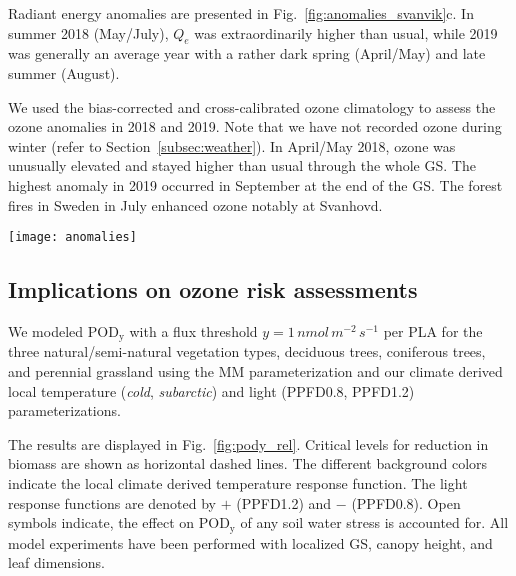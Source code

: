 \documentclass[bg, manuscript]{copernicus}
\begin{document}
Radiant energy anomalies are presented in Fig.~\ref{fig:anomalies_svanvik}c. In summer 2018 (May/July), $Q_e$ was extraordinarily higher than usual, while 2019 was generally an average year with a rather dark spring (April/May) and late summer (August).

We used the bias-corrected and cross-calibrated ozone climatology \citep{ACP:Falk2021} to assess the ozone anomalies in 2018 and 2019. Note that we have not recorded ozone during winter (refer to Section~\ref{subsec:weather}). In April/May 2018, ozone was unusually elevated and stayed higher than usual through the whole GS. The highest anomaly in 2019 occurred in September at the end of the GS. The forest fires in Sweden in July enhanced ozone notably at Svanhovd.

\begin{figure*}[t]
  
  \centering
  \texttt{[image: anomalies]}
  \caption{2018 and 2019 anomalies of key environmental variables at Svanhovd displayed as difference from median for each month. The hatched area between indicates the IQR. (a) Temperature; (b) precipitation; (c) radiant energy; (d) ozone VMR.}
  \label{fig:anomalies_svanvik}
\end{figure*}


\subsection{Implications on ozone risk assessments}
\label{subsec:do3se_results}

We modeled $\mathrm{POD_y}$ with a flux threshold $y=1\,\unit{nmol\,m^{-2}\,s^{-1}}$ per PLA for the three natural/semi-natural vegetation types, deciduous trees, coniferous trees, and perennial grassland using the MM parameterization and our climate derived local temperature (\emph{cold}, \emph{subarctic}) and light (PPFD0.8, PPFD1.2) parameterizations. 

The results are displayed in Fig.~\ref{fig:pody_rel}. Critical levels for reduction in biomass \citep[deciduous forest $4\,\unit{\%}$, coniferous forest $2\,\unit{\%}$, and grasslands $10\,\unit{\%}$ adopted from][]{ICP:MappingManual2017,ESPR:Hayes2021} are shown as horizontal dashed lines. The different background colors indicate the local climate derived temperature response function. The light response functions are denoted by $+$ (PPFD1.2) and $-$ (PPFD0.8). Open symbols indicate, the effect on $\mathrm{POD_y}$ of any soil water stress is accounted for. All model experiments have been performed with localized GS, canopy height, and leaf dimensions.
\end{document}
